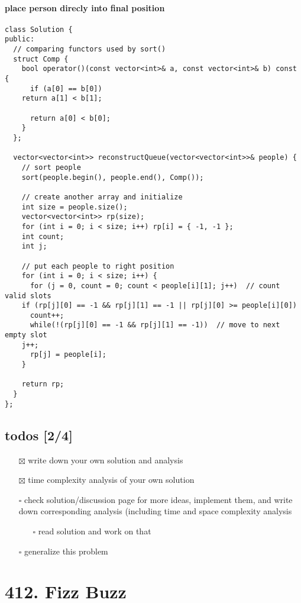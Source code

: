 \documentclass[11pt]{article}
\begin{document}
\paragraph{place person direcly into final position}
\label{sec:org3e34a5b}
\begin{verbatim}
class Solution {
public:
  // comparing functors used by sort()
  struct Comp {
    bool operator()(const vector<int>& a, const vector<int>& b) const {
      if (a[0] == b[0])
	return a[1] < b[1];

      return a[0] < b[0];
    }
  };

  vector<vector<int>> reconstructQueue(vector<vector<int>>& people) {
    // sort people 
    sort(people.begin(), people.end(), Comp());

    // create another array and initialize
    int size = people.size();
    vector<vector<int>> rp(size);
    for (int i = 0; i < size; i++) rp[i] = { -1, -1 };
    int count;
    int j;

    // put each people to right position
    for (int i = 0; i < size; i++) {
      for (j = 0, count = 0; count < people[i][1]; j++)  // count valid slots
	if (rp[j][0] == -1 && rp[j][1] == -1 || rp[j][0] >= people[i][0])
	  count++;
      while(!(rp[j][0] == -1 && rp[j][1] == -1))  // move to next empty slot
	j++;
      rp[j] = people[i];
    }

    return rp;
  }
};
\end{verbatim}
\subsection{todos [2/4]}
\label{sec:orgd864d62}
\begin{itemize}
\item[{$\boxtimes$}] write down your own solution and analysis
\item[{$\boxtimes$}] time complexity analysis of your own solution
\item[{$\square$}] check solution/discussion page for more ideas, implement them, and write down corresponding analysis (including time and space complexity analysis
\begin{itemize}
\item[{$\square$}] read solution and work on that
\end{itemize}
\item[{$\square$}] generalize this problem
\end{itemize}
\section{412. Fizz Buzz}
\label{sec:orge49bbb7}
\end{document}
